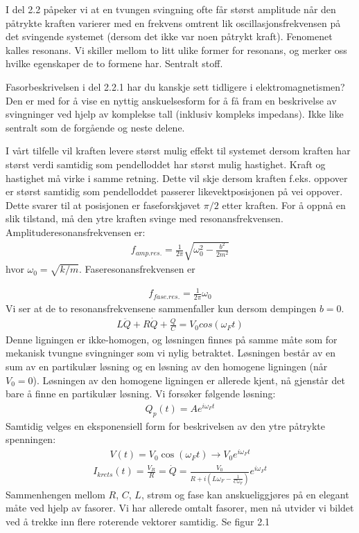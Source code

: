 \documentclass[12pt]{article}
\numberwithin{equation}{section}
\numberwithin{figure}{section}
\newcommand{\ma}[1]{$#1$}
\newcommand{\eq}[1]{{\small\begin{align}#1\end{align}}}
\begin{document}
I del 2.2 påpeker vi at en tvungen svingning ofte får størst amplitude når den påtrykte kraften varierer med en frekvens omtrent lik oscillasjonsfrekvensen på det svingende systemet (dersom det ikke var noen påtrykt kraft). Fenomenet kalles resonans. Vi skiller mellom to litt ulike former for resonans, og merker oss hvilke egenskaper de to formene har. Sentralt stoff.

Fasorbeskrivelsen i del 2.2.1 har du kanskje sett tidligere i elektromagnetismen? Den er med for å vise en nyttig anskuelsesform for å få fram en beskrivelse av svingninger ved hjelp av komplekse tall (inklusiv kompleks impedans). Ikke like sentralt som de forgående og neste delene.

\begin{tcolorbox}[title = Del 2.2 -- Resonans,breakable]
I vårt tilfelle vil kraften levere størst mulig effekt 
til systemet dersom kraften har størst
verdi samtidig som pendelloddet har størst mulig hastighet. Kraft og hastighet må virke
i samme retning. Dette vil skje dersom kraften f.eks. oppover er størst samtidig som
pendelloddet passerer likevektposisjonen på vei oppover. Dette svarer til at posisjonen er
faseforskjøvet $\pi/2$ etter kraften. For å oppnå en slik tilstand, 
må den ytre kraften svinge med resonansfrekvensen.
\tcbline
Amplituderesonansfrekvensen er:
\eq{f_{amp.res.} = \frac{1}{2\pi} \sqrt{\omega_0^2 - \frac{b^2}{2m^2}}}
hvor $\omega_0 = \sqrt{k/m}$.
Faseresonansfrekvensen er

\eq{f_{fase.res.} = \frac{1}{2\pi} \omega_0}
Vi ser at de to resonansfrekvensene sammenfaller kun dersom dempingen $b = 0$.
\tcbline
\eq{L\ddot Q + R \dot Q +
\frac{Q}{C} = V_0 cos(\omega_F t)}
Denne ligningen er ikke-homogen, og løsningen finnes på samme måte som for mekanisk
tvungne svingninger som vi nylig betraktet. Løsningen består av en sum av en partikulær
løsning og en løsning av den homogene ligningen (når $V_0 = 0$). Løsningen av den homogene
ligningen er allerede kjent, nå gjenstår det bare å finne en partikulær løsning. Vi forsøker
følgende løsning:
\tcbline
\eq{Q_p(t) = A e^{i \omega_F t}}
\tcbline
Samtidig velges en eksponensiell form for beskrivelsen av den ytre påtrykte spenningen:
\eq{V(t) = V_0 \cos(\omega_F t) \rightarrow V_0 e^{i \omega_F t}}
\tcbline
\eq{I_{krets}(t) =\frac{V_R}{R} = \dot Q 
= \frac{V_0}{R + i(L \omega_F - \frac{1}{C\omega_F})} e^{i\omega_F t}}
\tcbline
Sammenhengen mellom \ma R, \ma C, \ma L, strøm og fase kan anskueliggjøres på en elegant måte ved
hjelp av fasorer. Vi har allerede omtalt fasorer, men nå utvider vi bildet ved å trekke inn
flere roterende vektorer samtidig. Se figur 2.1
\end{tcolorbox}
\end{document}
